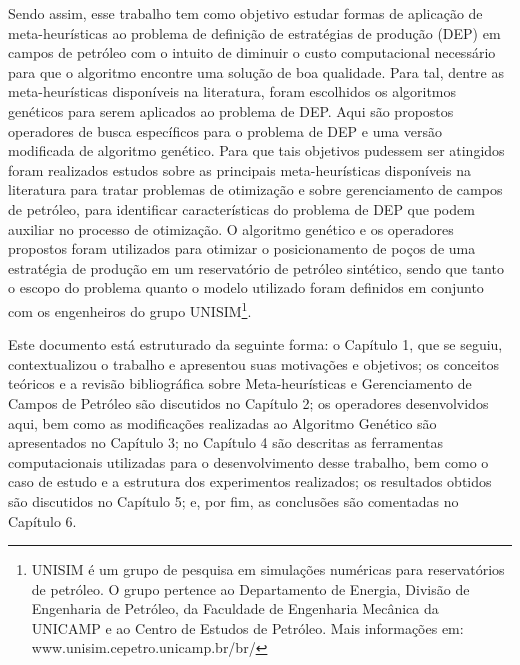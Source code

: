 Sendo assim, esse trabalho tem como objetivo estudar formas de aplicação de meta-heurísticas ao problema de definição de estratégias de produção (DEP) em campos de petróleo com o intuito de diminuir o custo computacional necessário para que o algoritmo encontre uma solução de boa qualidade. Para tal, dentre as meta-heurísticas disponíveis na literatura, foram escolhidos os algoritmos genéticos para serem aplicados ao problema de DEP. Aqui são propostos operadores de busca específicos para o problema de DEP e uma versão modificada de algoritmo genético. Para que tais objetivos pudessem ser atingidos foram realizados estudos sobre as principais meta-heurísticas disponíveis na literatura para tratar problemas de otimização e sobre gerenciamento de campos de petróleo, para identificar características do problema de DEP que podem auxiliar no processo de otimização. O algoritmo genético e os operadores propostos foram utilizados para otimizar o posicionamento de poços de uma estratégia de produção em um reservatório de petróleo sintético, sendo que tanto o escopo do problema quanto o modelo utilizado foram definidos em conjunto com os engenheiros do grupo UNISIM\footnote{UNISIM é um grupo de pesquisa em simulações numéricas para reservatórios de petróleo. O grupo pertence ao Departamento de Energia, Divisão de Engenharia de Petróleo, da Faculdade de Engenharia Mecânica da UNICAMP e ao Centro de Estudos de Petróleo. Mais informações em: www.unisim.cepetro.unicamp.br/br/}.

Este documento está estruturado da seguinte forma: o Capítulo 1, que se seguiu, contextualizou o trabalho e apresentou suas motivações e objetivos; os conceitos teóricos e a revisão bibliográfica sobre Meta-heurísticas e Gerenciamento de Campos de Petróleo são discutidos no Capítulo 2; os operadores desenvolvidos aqui, bem como as modificações realizadas ao Algoritmo Genético são apresentados no Capítulo 3; no Capítulo 4 são descritas as ferramentas computacionais utilizadas para o desenvolvimento desse trabalho, bem como o caso de estudo e a estrutura dos experimentos realizados; os resultados obtidos são discutidos no Capítulo 5; e, por fim, as conclusões são comentadas no Capítulo 6.